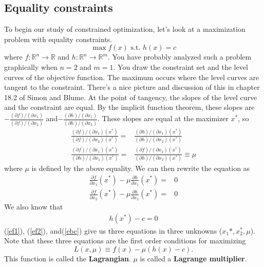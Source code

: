 \documentclass[12pt,reqno]{amsart}
\theoremstyle{definition}
\def\R{\mathbb{R}}
\renewcommand{\to}{{\rightarrow}}
\begin{document}
\subsection{Equality constraints}
To begin our study of constrained optimization, let's look at a
maximization problem with equality constraints. 
\[ \max f(x) \text{ s.t. } h(x) = c \]
where $f: \R^n \to \R$ and $h: \R^n \to \R^m$. You have probably
analyzed such a problem graphically when $n=2$ and $m=1$. You draw the
constraint set and the level curves of the objective function. The
maximum occurs where the level curves are tangent to the
constraint. There's a nice picture and discussion of this in chapter
18.2 of Simon and Blume.  At the point of tangency, the slopes of the
level curve and the constraint are equal. By the implicit function
theorem, these slopes are $-\frac{(\partial f)/(\partial x_1)}
{(\partial f)/(\partial x_2)}$ and$-\frac{(\partial h)/(\partial x_1)}
{(\partial h)/(\partial x_2)}$. These slopes are equal at the
maximizer $x^*$, so
\begin{align*}
  \frac{(\partial f)/(\partial x_1) (x^*)}
  {(\partial f)/(\partial x_2)(x^*)} = & \frac{(\partial h)/(\partial x_1)(x^*)}
  {(\partial h)/(\partial x_2)(x^*)} \\
  \frac{(\partial f)/(\partial x_1)(x^*)}
  {(\partial h)/(\partial x_1)(x^*)} = & \frac{(\partial f)/(\partial x_2)(x^*)}
  {(\partial h)/(\partial x_2)(x^*)} \equiv \mu
\end{align*}
where $\mu$ is defined by the above equality. We can then rewrite the
equation as
\begin{align}
  \frac{\partial f}{\partial x_1} (x^*) - \mu \frac{\partial
    h}{\partial x_1}(x^*) = & 0 \label{ef1} \\
  \frac{\partial f}{\partial x_2} (x^*) - \mu \frac{\partial
    h}{\partial x_2}(x^*) = & 0 \label{ef2}
\end{align}
We also know that 
\begin{align}
  h(x^*) - c = 0\label{ebc}
\end{align}
(\ref{ef1}), (\ref{ef2}), and(\ref{ebc}) give us three equations in
three unknowns ($x_1*, x_2^*, \mu$).  Note that these three equations
are the first order conditions for maximizing 
\[ L(x,\mu) \equiv f(x) - \mu(h(x) - c). \]
This function is called the \textbf{Lagrangian}. $\mu$ is called a
\textbf{Lagrange multiplier}. 
\end{document}
